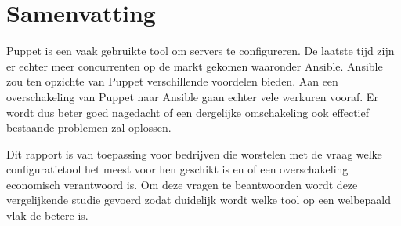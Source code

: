 





\chapter*{Samenvatting}
Puppet is een vaak gebruikte tool om servers te configureren. De laatste tijd zijn er echter meer concurrenten op de markt gekomen waaronder Ansible. Ansible zou ten opzichte van Puppet verschillende voordelen bieden. Aan een overschakeling van Puppet naar Ansible gaan echter vele werkuren vooraf. Er wordt dus beter goed nagedacht of een dergelijke omschakeling ook effectief bestaande problemen zal oplossen.


Dit rapport is van toepassing voor bedrijven die worstelen met de vraag welke configuratietool het meest voor hen geschikt is en of een overschakeling economisch verantwoord is. Om deze vragen te beantwoorden wordt deze vergelijkende studie gevoerd zodat duidelijk wordt welke tool op een welbepaald vlak de betere is.

